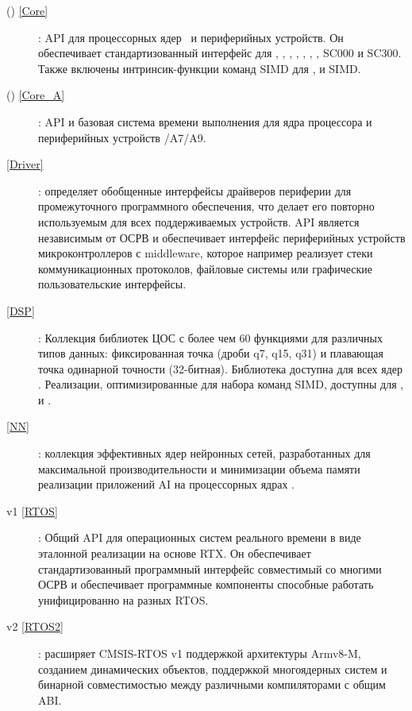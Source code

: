 

\begin{description}

\item[ (\cm{}) \ref{Core}]: API для процессорных ядер \cm{}\ и
периферийных устройств. Он обес\-пе\-чи\-ва\-ет стандартизованный интерфейс для
, , , , , , ,
SC000 и SC300. Также включены интринсик-функции команд SIMD для ,
 и  SIMD.

\item[ (\ca{}) \ref{Core_A}]: API и базовая система времени
выполнения для ядра процессора и периферий\-ных устройств /A7/A9.

\item[ \ref{Driver}]: определяет обобщенные интерфейсы
драйверов периферии для промежуточного программ\-ного обеспечения, что делает
его повторно используемым для всех поддерживаемых устройств. API является
независимым от ОСРВ и обеспечивает интерфейс периферийных устройств
микроконтроллеров с middleware, которое например реализует стеки
коммуникационных протоколов, файловые системы или графические пользовательские
интерфейсы.

\item[ \ref{DSP}]: Коллекция библиотек ЦОС с более чем 60
функциями для различных типов данных: фиксированная точка (дроби q7, q15, q31) и
плавающая точка одинарной точности (32-битная). Библио\-те\-ка доступна для всех
ядер \cm{}. Реализации, оптимизированные для набора команд SIMD, доступ\-ны для
,  и .

\item[ \ref{NN}]: коллекция эффективных ядер нейронных сетей,
разработанных для максимальной произво\-ди\-тель\-ности и минимизации объема
памяти реализации приложений AI на процессорных ядрах \cm{}.

\item[ v1 \ref{RTOS}]: Общий API для операционных систем
реального времени в виде эталонной реализации на основе RTX. Он обеспечивает
стандартизованный программный интерфейс совместимый со многими ОСРВ и
обеспечивает программные компоненты способные работать унифицированно на разных
RTOS.

\item[ v2 \ref{RTOS2}]: расширяет CMSIS-RTOS v1 поддержкой
архитектуры Armv8-M, созданием динамичес\-ких объектов, поддержкой многоядерных
систем и бинарной совместимостью между различными ком\-пи\-ляторами с общим ABI.


\end{description}
